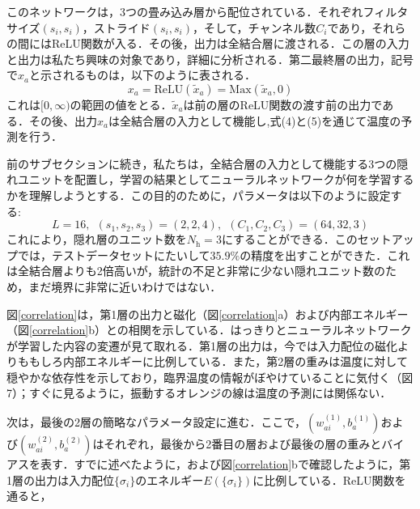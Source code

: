 \documentclass[a4paper,11pt]{jsreport}
\begin{document}
このネットワークは，3つの畳み込み層から配位されている．それぞれフィルタサイズ$(s_i,s_i)$，ストライド$(s_i,s_i)$，そして，チャンネル数$C_i$であり，それらの間にはReLU関数が入る．その後，出力は全結合層に渡される．この層の入力と出力は私たち興味の対象であり，詳細に分析される．第二最終層の出力，記号で$x_a$と示されるものは，以下のように表される．
\begin{equation}
  x_a = \text{ReLU}(\tilde{x}_a) = \text{Max}(\tilde{x}_a,0)
\end{equation}
これは$[0,\infty)$の範囲の値をとる．$\tilde{x}_a$は前の層のReLU関数の渡す前の出力である．その後、出力$x_a$は全結合層の入力として機能し,式(4)と(5)を通じて温度の予測を行う．\par
前のサブセクションに続き，私たちは，全結合層の入力として機能する3つの隠れユニットを配置し，学習の結果としてニューラルネットワークが何を学習するかを理解しようとする．この目的のために，パラメータは以下のように設定する:
\begin{equation}
  L = 16, \ \ (s_1, s_2, s_3) = (2, 2, 4), \ \ (C_1, C_2, C_3) = (64, 32, 3)
\end{equation}
これにより，隠れ層のユニット数を$N_{\text{h}}=3$にすることができる．このセットアップでは，テストデータセットにたいして$35.9\%$の精度を出すことができた．これは全結合層よりも2倍高いが，統計の不足と非常に少ない隠れユニット数のため，まだ境界に非常に近いわけではない．\par
図\ref{correlation}は，第1層の出力と磁化（図\ref{correlation}a）および内部エネルギー（図\ref{correlation}b）との相関を示している．はっきりとニューラルネットワークが学習した内容の変遷が見て取れる．第1層の出力は，今では入力配位の磁化よりももしろ内部エネルギーに比例している．また，第2層の重みは温度に対して穏やかな依存性を示しており，臨界温度の情報がぼやけていることに気付く（図7）；すぐに見るように，振動するオレンジの線は温度の予測には関係ない．\par
次は，最後の2層の簡略なパラメータ設定に進む．ここで，$(w_{ai}^{(1)}, b_a^{(1)})$および$(w_{ai}^{(2)}, b_a^{(2)})$はそれぞれ，最後から2番目の層および最後の層の重みとバイアスを表す．すでに述べたように，および図\ref{correlation}bで確認したように，第1層の出力は入力配位$\{ \sigma_i \}$のエネルギー$E(\{ \sigma_i \})$に比例している．ReLU関数を通ると，
\end{document}
